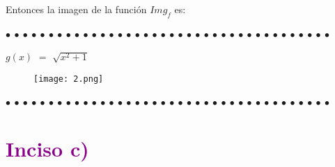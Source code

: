 \documentclass[12pt]{article}
\newenvironment{MyColorPar}[1]{%
    \leavevmode\color{#1}\ignorespaces%
}{%
}%
\begin{document}
\begin{MyColorPar}{Cinnabar}
{Entonces la imagen de la función $Img_{f}$ es: \vspace{0.5cm}

\hspace{3cm} \fbox{$y$ $\in$ ($-$ $\infty$ , $1$] $\cup$ [$1$, $\infty$)}} \vspace{0.5cm}

\end{MyColorPar}

\begin{MyColorPar}{Saffron} \bfseries{
 $\bullet$ $\bullet$ $\bullet$ $\bullet$ $\bullet$ $\bullet$ $\bullet$ $\bullet$ $\bullet$ $\bullet$ $\bullet$ $\bullet$ $\bullet$ $\bullet$ $\bullet$ $\bullet$ $\bullet$ $\bullet$ $\bullet$ $\bullet$ $\bullet$ $\bullet$ $\bullet$ $\bullet$ $\bullet$ $\bullet$ $\bullet$ $\bullet$ $\bullet$ $\bullet$ $\bullet$ $\bullet$ $\bullet$ $\bullet$ $\bullet$ $\bullet$ $\bullet$ $\bullet$  }
\end{MyColorPar} \vspace{0.5cm}

\begin{MyColorPar}{Lochinvar} \bfseries{
{}}  \vspace{0.5cm}
\end{MyColorPar}

 $g(x)$ $=$ $\sqrt{x^{2} +1}$ \vspace{0.5cm}
 
 \begin{figure}[htb] \centering

    \texttt{[image: 2.png]} 

\end{figure}
 
 \begin{MyColorPar}{Saffron} \bfseries{
 $\bullet$ $\bullet$ $\bullet$ $\bullet$ $\bullet$ $\bullet$ $\bullet$ $\bullet$ $\bullet$ $\bullet$ $\bullet$ $\bullet$ $\bullet$ $\bullet$ $\bullet$ $\bullet$ $\bullet$ $\bullet$ $\bullet$ $\bullet$ $\bullet$ $\bullet$ $\bullet$ $\bullet$ $\bullet$ $\bullet$ $\bullet$ $\bullet$ $\bullet$ $\bullet$ $\bullet$ $\bullet$ $\bullet$ $\bullet$ $\bullet$ $\bullet$ $\bullet$ $\bullet$  }
\end{MyColorPar} \vspace{0.5cm}

\section*{{\textcolor{darkmagenta}{\textsf{\bfseries{Inciso c)}}}}}
\end{document}
